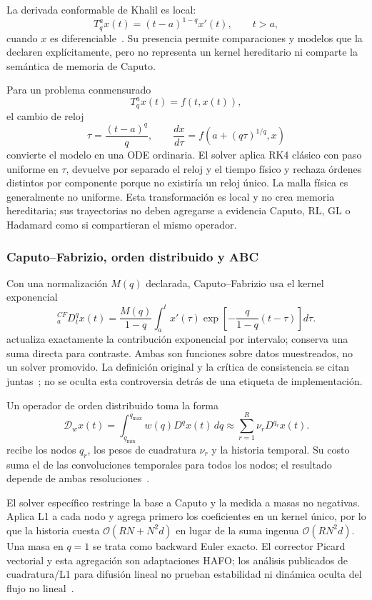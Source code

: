 La derivada conformable de Khalil es local:
\[
 T_q^a x(t)=(t-a)^{1-q}x'(t),\qquad t>a,
\]
cuando \(x\) es diferenciable~\cite{KhalilEtAl2014}. Su presencia permite
comparaciones y modelos que la declaren explícitamente, pero no representa un
kernel hereditario ni comparte la semántica de memoria de Caputo.

Para un problema conmensurado
\[
 T_q^a x(t)=f(t,x(t)),
\]
el cambio de reloj
\[
 \tau=\frac{(t-a)^q}{q},\qquad
 \frac{dx}{d\tau}=f\!\left(a+(q\tau)^{1/q},x\right)
\]
convierte el modelo en una ODE ordinaria. El solver
 aplica RK4 clásico con paso uniforme en
\(\tau\), devuelve por separado el reloj y el tiempo físico y rechaza órdenes
distintos por componente porque no existiría un reloj único. La malla física es
generalmente no uniforme. Esta transformación es local y no crea memoria
hereditaria; sus trayectorias no deben agregarse a evidencia Caputo, RL, GL o
Hadamard como si compartieran el mismo operador.

\subsubsection{Caputo--Fabrizio, orden distribuido y ABC}

Con una normalización \(M(q)\) declarada, Caputo--Fabrizio usa el kernel
exponencial
\[
 {}_a^{CF}D_t^q x(t)=
 \frac{M(q)}{1-q}\int_a^t x'(\tau)
 \exp\!\left[-\frac{q}{1-q}(t-\tau)\right]d\tau .
\]
 actualiza exactamente la contribución
exponencial por intervalo; 
conserva una suma directa para contraste. Ambas son funciones sobre datos
muestreados, no un solver promovido. La definición original y la crítica de
consistencia se citan juntas~\cite{CaputoFabrizio2015,DiethelmEtAl2020}; no se
oculta esta controversia detrás de una etiqueta de implementación.

Un operador de orden distribuido toma la forma
\[
 \mathcal D_w x(t)=\int_{q_{\min}}^{q_{\max}}
 w(q)D^q x(t)\,dq
 \approx \sum_{r=1}^{R}\nu_rD^{q_r}x(t).
\]
 recibe los nodos \(q_r\), los pesos
de cuadratura \(\nu_r\) y la historia temporal. Su costo suma el de las
convoluciones temporales para todos los nodos; el resultado depende de ambas
resoluciones~\cite{CaputoDistributed2001,DiethelmFord2009}.

El solver específico  restringe
la base a Caputo y la medida a masas no negativas. Aplica L1 a cada nodo y
agrega primero los coeficientes en un kernel único, por lo que la historia cuesta
\(\mathcal O(RN+N^2d)\) en lugar de la suma ingenua
\(\mathcal O(RN^2d)\). Una masa en \(q=1\) se trata como backward Euler
exacto. El corrector Picard vectorial y esta agregación son adaptaciones HAFO;
los análisis publicados de cuadratura/L1 para difusión lineal no prueban
estabilidad ni dinámica oculta del flujo no lineal~\cite{HuEtAl2014Distributed,LinXu2007L1}.

